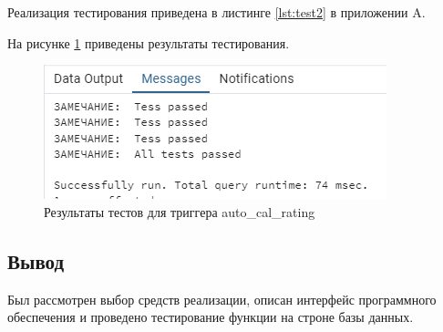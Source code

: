 Реализация тестирования приведена в листинге \ref{lst:test2} в приложении A.

На рисунке \ref{img:testtrigger} приведены результаты тестирования.
\begin{figure}[h]
	\centering
	\includegraphics[height=0.2\textheight]{img/testtrigger.png}
	\caption{Результаты тестов для триггера auto\_cal\_rating}
	\label{img:testtrigger}
\end{figure}
\subsection*{Вывод}
Был рассмотрен выбор средств реализации, описан интерфейс программного обеспечения и проведено тестирование функции на строне базы данных.
